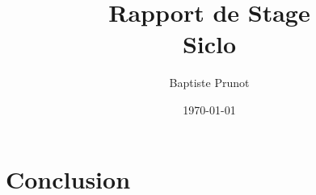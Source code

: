 \documentclass[11pt]{report}
\author{Baptiste Prunot}
\title{Rapport de Stage\\Siclo}
\date{\today}
\begin{document}
    \frontpage
    \tableofcontents
    \pagebreak
    
    
    
    \part{Conclusion}
\end{document}
